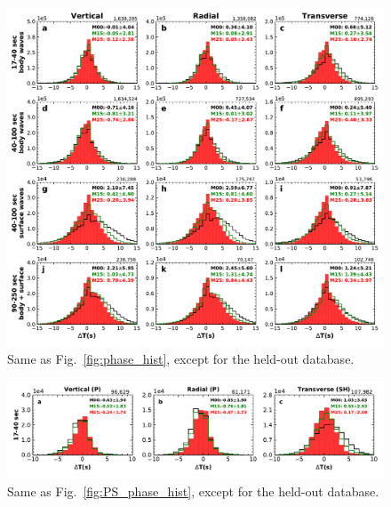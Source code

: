\documentclass[extra,mreferee]{gji}
\begin{document}

\begin{figure}
  \centering
  \includegraphics[width=\textwidth]{figures/dt_histogram_360.pdf}
  \caption{\small{Same as Fig.~\ref{fig:phase_hist}, except for the held-out database.
  }}
  \label{fig:phase_hist_360}
\end{figure}


\begin{figure}
  \centering
  \includegraphics[width=\textwidth]{figures/dt_histogram_360_phase.pdf}
  \caption{\small{Same as Fig.~\ref{fig:PS_phase_hist}, except for the held-out database.}}
  \label{fig:phase_hist_360_P}
\end{figure}
\end{document}
